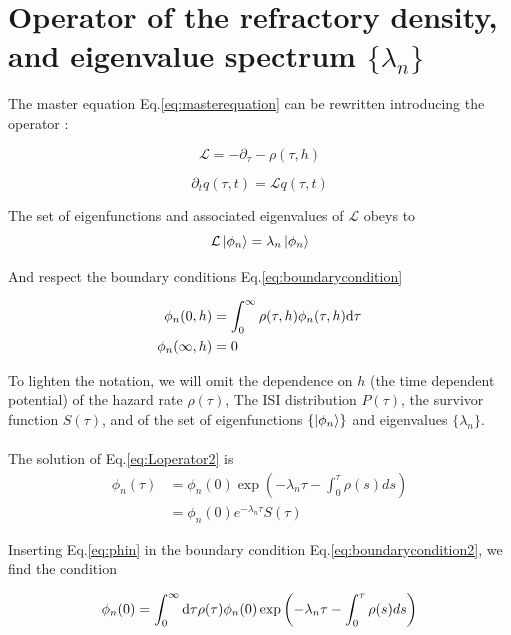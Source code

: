 \documentclass[12pt,twoside]{report}
\def \dd  {{\rm d}}
\begin{document}
\section{Operator of the refractory density, and eigenvalue spectrum $\{\lambda_n\}$}
\label{sec:op}

The master equation Eq.\eqref{eq:masterequation} can be rewritten introducing the operator :

\begin{equation}
\label{eq:Loperator}
\mathcal{L}=-\partial_\tau-\rho(\tau,h)
\end{equation}

\begin{equation}
\label{eq:masterequation2}
\partial_t q(\tau,t)=\mathcal{L}q(\tau,t)
\end{equation}

The set of eigenfunctions and associated eigenvalues of $\mathcal{L}$ obeys to
\begin{equation}
\label{eq:Loperator2}
\mathcal{L}\ket{\phi_n}=\lambda_n\ket{\phi_n}
\end{equation}

And respect the boundary conditions Eq.\eqref{eq:boundarycondition}

\begin{align}
\label{eq:boundarycondition2}
\phi_n(0,h)&=\int_0^\infty\rho(\tau,h)\phi_n(\tau,h)\dd\tau\\
\phi_n(\infty,h)&=0
\end{align}


To lighten the notation, we will omit the dependence on $h$ (the time dependent potential) of the hazard rate $\rho(\tau)$, The ISI distribution $P(\tau)$, the survivor function $S(\tau)$, and of the set of eigenfunctions $\{\ket{\phi_n}\}$ and eigenvalues $\{\lambda_n\}$.\\ \\%

The solution of Eq.\eqref{eq:Loperator2} is
\begin{align}
\label{eq:phin}
\phi_n(\tau)&=\phi_n(0)\exp\left(-\lambda_n\tau-\int_0^\tau\rho(s)ds\right)\nonumber\\
&=\phi_n(0)e^{-\lambda_n\tau}S(\tau)
\end{align}

Inserting Eq.\eqref{eq:phin} in the boundary condition Eq.\eqref{eq:boundarycondition2}, we find the condition

\begin{equation}
\label{eq:condition1}
\phi_n(0)=\int_0^\infty\dd\tau\rho(\tau)\phi_n(0)\exp\left(-\lambda_n\tau-\int_0^\tau\rho(s)ds\right)
\end{equation}
\end{document}
